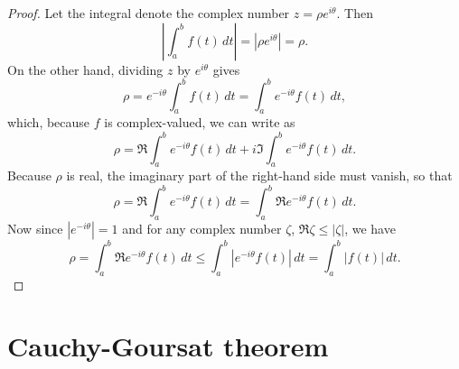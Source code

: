 \begin{proof}
    Let the integral denote the complex number \(z = \rho e^{i\theta}\). Then
    \[
        \left| \int_a^b f(t) \, dt \right| = \left| \rho e^{i\theta} \right| = \rho.
    \]
    On the other hand, dividing \(z\) by \(e^{i\theta}\) gives
    \[
        \rho = e^{-i\theta} \int_a^b f(t) \, dt = \int_a^b e^{-i\theta} f(t) \, dt,
    \]
    which, because \(f\) is complex-valued, we can write as
    \[
        \rho = \Re \int_a^b e^{-i\theta} f(t) \, dt + i \Im \int_a^b e^{-i\theta} f(t) \, dt.
    \]
    Because \(\rho\) is real, the imaginary part of the right-hand side must vanish, so that
    \[
        \rho = \Re \int_a^b e^{-i\theta} f(t) \, dt = \int_a^b \Re e^{-i\theta} f(t) \, dt.
    \]
    Now since \(|e^{-i\theta}| = 1\) and for any complex number \(\zeta\), \(\Re \zeta \leq |\zeta|\), we have
    \[
        \rho = \int_a^b \Re e^{-i\theta} f(t) \, dt \leq \int_a^b |e^{-i\theta} f(t)| \, dt = \int_a^b |f(t)| \, dt.
    \]
\end{proof}


\section{Cauchy-Goursat theorem}